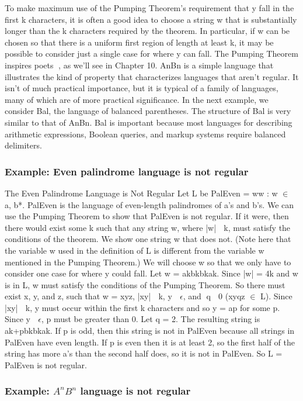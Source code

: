 \documentclass{article}
\begin{document}
To make maximum use of the Pumping Theorem’s requirement that y fall in the
first k characters, it is often a good idea to choose a string w that is
substantially longer than the k characters required by the theorem. In
particular, if w can be chosen so that there is a uniform first region of
length at least k, it may be possible to consider just a single case for where
y can fall. The Pumping Theorem inspires poets , as we’ll see in Chapter 10.
AnBn is a simple language that illustrates the kind of property that
characterizes languages that aren’t regular. It isn’t of much practical
importance, but it is typical of a family of languages, many of which are of
more practical significance. In the next example, we consider Bal, the language
of balanced parentheses. The structure of Bal is very similar to that of AnBn.
Bal is important because most languages for describing arithmetic expressions,
Boolean queries, and markup systems require balanced delimiters.

\subsubsection{Example: Even palindrome language is not regular}

The Even Palindrome Language is Not Regular Let L be PalEven = {ww : w $\in$ {a,
b}*}. PalEven is the language of even-length palindromes of a’s and b’s. We can
use the Pumping Theorem to show that PalEven is not regular. If it were, then
there would exist some k such that any string w, where |w|  k, must satisfy
the conditions of the theorem. We show one string w that does not. (Note here
that the variable w used in the definition of L is different from the variable
w mentioned in the Pumping Theorem.) We will choose w so that we only have to
consider one case for where y could fall. Let w = akbkbkak. Since |w| = 4k and
w is in L, w must satisfy the conditions of the Pumping Theorem. So there must
exist x, y, and z, such that w = xyz, |xy|  k, y  $\epsilon$, and q  0 (xyqz $\in$ L).
Since |xy|  k, y must occur within the first k characters and so y = ap for
some p. Since y  $\epsilon$, p must be greater than 0. Let q = 2. The resulting string
is ak+pbkbkak. If p is odd, then this string is not in PalEven because all
strings in PalEven have even length. If p is even then it is at least 2, so the
first half of the string has more a’s than the second half does, so it is not
in PalEven. So L = PalEven is not regular.

\subsubsection{Example: $A^nB^n$ language is not regular }
\end{document}
